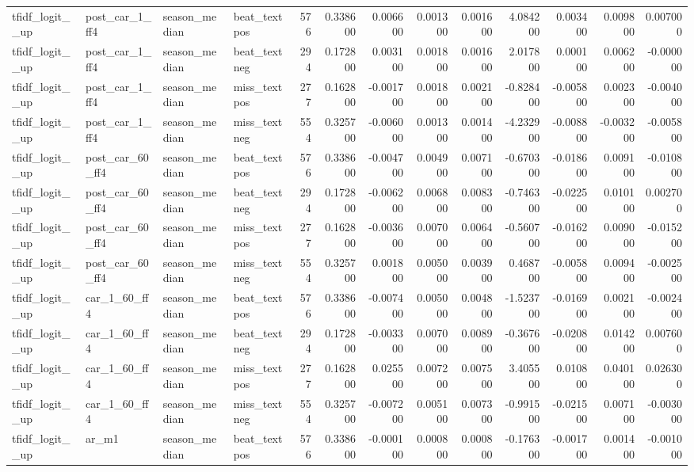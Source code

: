\begin{table}
\begin{tabular}{llllrrrrrrrrr}
tfidf\_logit\_\_up & post\_car\_1\_ff4 & season\_median & beat\_textpos & 576 & 0.338600 & 0.006600 & 0.001300 & 0.001600 & 4.084200 & 0.003400 & 0.009800 & 0.007000 \\
tfidf\_logit\_\_up & post\_car\_1\_ff4 & season\_median & beat\_textneg & 294 & 0.172800 & 0.003100 & 0.001800 & 0.001600 & 2.017800 & 0.000100 & 0.006200 & -0.000000 \\
tfidf\_logit\_\_up & post\_car\_1\_ff4 & season\_median & miss\_textpos & 277 & 0.162800 & -0.001700 & 0.001800 & 0.002100 & -0.828400 & -0.005800 & 0.002300 & -0.004000 \\
tfidf\_logit\_\_up & post\_car\_1\_ff4 & season\_median & miss\_textneg & 554 & 0.325700 & -0.006000 & 0.001300 & 0.001400 & -4.232900 & -0.008800 & -0.003200 & -0.005800 \\
tfidf\_logit\_\_up & post\_car\_60\_ff4 & season\_median & beat\_textpos & 576 & 0.338600 & -0.004700 & 0.004900 & 0.007100 & -0.670300 & -0.018600 & 0.009100 & -0.010800 \\
tfidf\_logit\_\_up & post\_car\_60\_ff4 & season\_median & beat\_textneg & 294 & 0.172800 & -0.006200 & 0.006800 & 0.008300 & -0.746300 & -0.022500 & 0.010100 & 0.002700 \\
tfidf\_logit\_\_up & post\_car\_60\_ff4 & season\_median & miss\_textpos & 277 & 0.162800 & -0.003600 & 0.007000 & 0.006400 & -0.560700 & -0.016200 & 0.009000 & -0.015200 \\
tfidf\_logit\_\_up & post\_car\_60\_ff4 & season\_median & miss\_textneg & 554 & 0.325700 & 0.001800 & 0.005000 & 0.003900 & 0.468700 & -0.005800 & 0.009400 & -0.002500 \\
tfidf\_logit\_\_up & car\_1\_60\_ff4 & season\_median & beat\_textpos & 576 & 0.338600 & -0.007400 & 0.005000 & 0.004800 & -1.523700 & -0.016900 & 0.002100 & -0.002400 \\
tfidf\_logit\_\_up & car\_1\_60\_ff4 & season\_median & beat\_textneg & 294 & 0.172800 & -0.003300 & 0.007000 & 0.008900 & -0.367600 & -0.020800 & 0.014200 & 0.007600 \\
tfidf\_logit\_\_up & car\_1\_60\_ff4 & season\_median & miss\_textpos & 277 & 0.162800 & 0.025500 & 0.007200 & 0.007500 & 3.405500 & 0.010800 & 0.040100 & 0.026300 \\
tfidf\_logit\_\_up & car\_1\_60\_ff4 & season\_median & miss\_textneg & 554 & 0.325700 & -0.007200 & 0.005100 & 0.007300 & -0.991500 & -0.021500 & 0.007100 & -0.003000 \\
tfidf\_logit\_\_up & ar\_m1 & season\_median & beat\_textpos & 576 & 0.338600 & -0.000100 & 0.000800 & 0.000800 & -0.176300 & -0.001700 & 0.001400 & -0.001000 \\

\end{tabular}
\end{table}
